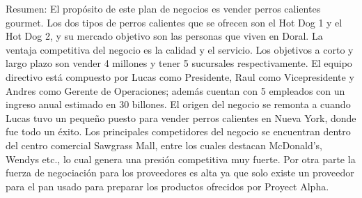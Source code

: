 


Resumen: El propósito de este plan de negocios es vender perros calientes gourmet. Los dos tipos de perros calientes que se ofrecen son el Hot Dog 1 y el Hot Dog 2, y su mercado objetivo son las personas que viven en Doral. La ventaja competitiva del negocio es la calidad y el servicio. Los objetivos a corto y largo plazo son vender 4 millones y tener 5 sucursales respectivamente. El equipo directivo está compuesto por Lucas como Presidente, Raul como Vicepresidente y Andres como Gerente de Operaciones; además cuentan con 5 empleados con un ingreso anual estimado en 30 billones. El origen del negocio se remonta a cuando Lucas tuvo un pequeño puesto para vender perros calientes en Nueva York, donde fue todo un éxito. Los principales competidores del negocio se encuentran dentro del centro comercial Sawgrass Mall, entre los cuales destacan McDonald's, Wendys etc., lo cual genera una presión competitiva muy fuerte. Por otra parte la fuerza de negociación para los proveedores es alta ya que solo existe un proveedor para el pan usado para preparar los productos ofrecidos por Proyect Alpha. 

